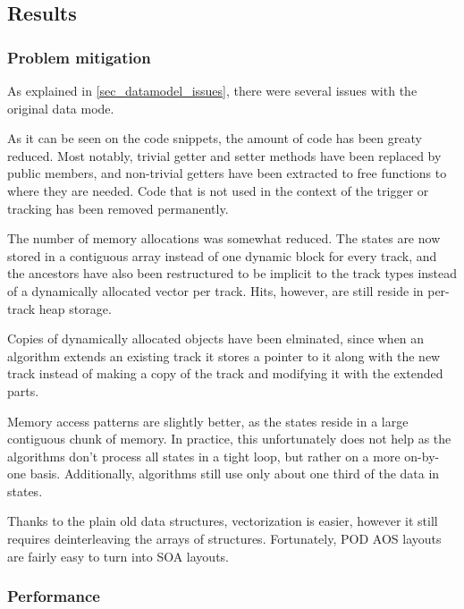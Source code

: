 \documentclass[12pt]{article}
\begin{document}
\subsection{Results}

\subsubsection{Problem mitigation}

As explained in \ref{sec_datamodel_issues}, there were several issues with the original data mode.

\vspace{1pc}
As it can be seen on the code snippets, the amount of code has been greaty reduced. Most notably, trivial getter and setter methods have been replaced by public members, and non-trivial getters have been extracted to free functions to where they are needed. Code that is not used in the context of the trigger or tracking has been removed permanently.

\vspace{1pc}
The number of memory allocations was somewhat reduced. The states are now stored in a contiguous array instead of one dynamic block for every track, and the ancestors have also been restructured to be implicit to the track types instead of a dynamically allocated vector per track. Hits, however, are still reside in per-track heap storage.

\vspace{1pc}
Copies of dynamically allocated objects have been elminated, since when an algorithm extends an existing track it stores a pointer to it along with the new track instead of making a copy of the track and modifying it with the extended parts.

\vspace{1pc}
Memory access patterns are slightly better, as the states reside in a large contiguous chunk of memory. In practice, this unfortunately does not help as the algorithms don't process all states in a tight loop, but rather on a more on-by-one basis. Additionally, algorithms still use only about one third of the data in states.

\vspace{1pc}
Thanks to the plain old data structures, vectorization is easier, however it still requires deinterleaving the arrays of structures. Fortunately, POD AOS layouts are fairly easy to turn into SOA layouts.


\subsubsection{Performance}
\end{document}
